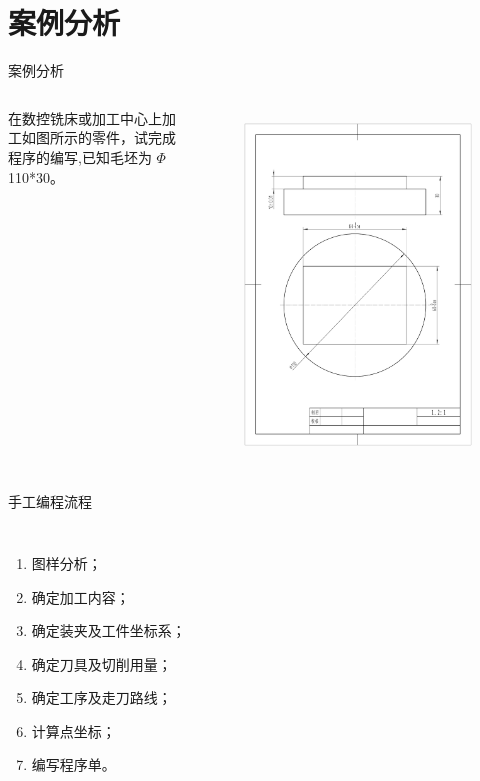 \documentclass[UTF8,zihao=-4]{ctexbeamer}
\begin{document}
\section{案例分析}
\begin{frame}{案例分析}
     \begin{columns}
        在数控铣床或加工中心上加工如图所示的零件，试完成程序的编写,已知毛坯为 $\Phi$ 110*30。

\begin{figure}
    \centering
    \includegraphics[width=0.8\linewidth,trim=50 150 50 100,clip]{image/3-1.jpg}
    \label{fig:3-1}
\end{figure}
    \end{columns}
\end{frame}

\begin{frame}{手工编程流程}
    \begin{columns}
\begin{enumerate}
    \item 图样分析；
    \item 确定加工内容；
    \item 确定装夹及工件坐标系；
    \item 确定刀具及切削用量；
    \item 确定工序及走刀路线；
    \item 计算点坐标；
    \item 编写程序单。
\end{enumerate}
    \end{columns}
\end{frame}
\end{document}

